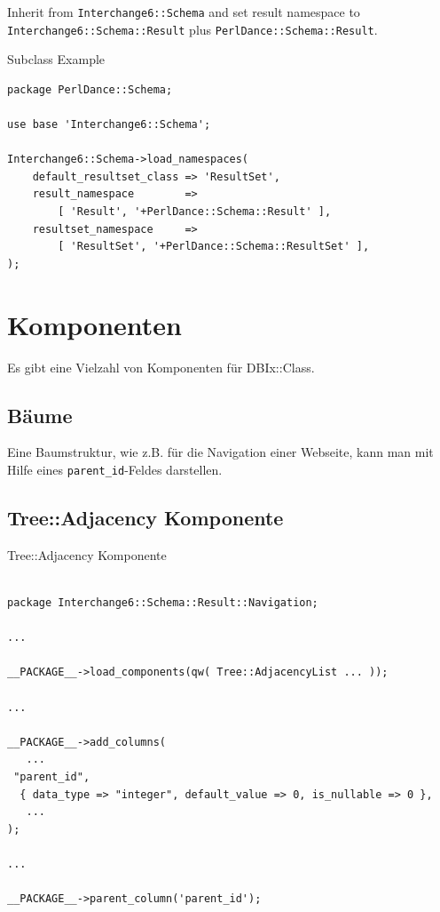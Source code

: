 Inherit from \verb|Interchange6::Schema| and set result namespace to 
\verb|Interchange6::Schema::Result| plus \verb|PerlDance::Schema::Result|.

\begin{frame}[fragile]{Subclass Example}
\begin{lstlisting}
package PerlDance::Schema;

use base 'Interchange6::Schema';

Interchange6::Schema->load_namespaces(
    default_resultset_class => 'ResultSet',
    result_namespace        =>
        [ 'Result', '+PerlDance::Schema::Result' ],
    resultset_namespace     =>
        [ 'ResultSet', '+PerlDance::Schema::ResultSet' ],
);
\end{lstlisting}
\end{frame}

\section{Komponenten}

Es gibt eine Vielzahl von Komponenten für DBIx::Class.

\subsection{Bäume}

Eine Baumstruktur, wie z.B. für die Navigation einer
Webseite, kann man mit Hilfe eines \verb|parent_id|-Feldes
darstellen.

\subsection{Tree::Adjacency Komponente}

\begin{frame}[fragile]{Tree::Adjacency Komponente}
\begin{lstlisting}

package Interchange6::Schema::Result::Navigation;

...

__PACKAGE__->load_components(qw( Tree::AdjacencyList ... ));

...

__PACKAGE__->add_columns(
   ...
 "parent_id",
  { data_type => "integer", default_value => 0, is_nullable => 0 },
   ...
);

...

__PACKAGE__->parent_column('parent_id');

\end{lstlisting}
\end{frame}

